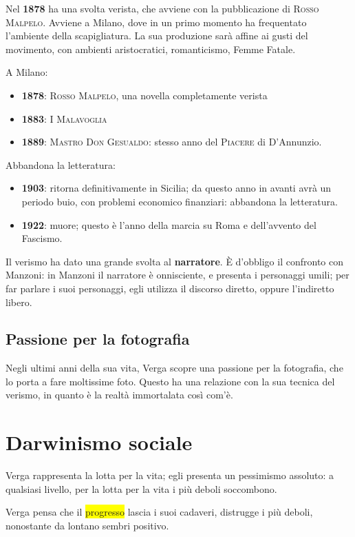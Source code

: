 \documentclass{book}
\newcommand{\pagine}[1]{\colorbox{yellow}{#1}}
\newcounter{mar}
\begin{document}
Nel \textbf{1878} ha una svolta verista, che avviene con la
pubblicazione di \textsc{Rosso Malpelo}. Avviene a Milano, dove in un
primo momento ha frequentato l'ambiente della scapigliatura. La sua
produzione sarà affine ai gusti del movimento, con ambienti
aristocratici, romanticismo, Femme Fatale.

A Milano: 
\begin{itemize}
\item \textbf{1878}: \textsc{Rosso Malpelo}, una novella
completamente verista
\item \textbf{1883}: \textsc{I Malavoglia}
\item \textbf{1889}: \textsc{Mastro Don Gesualdo}: stesso anno del \textsc{Piacere} di D'Annunzio.
\end{itemize}

Abbandona la letteratura: 
\begin{itemize}
\item \textbf{1903}: ritorna definitivamente in
Sicilia; da questo anno in avanti avrà un periodo buio, con problemi
economico finanziari: abbandona la letteratura. 
\item \textbf{1922}: muore; questo è l'anno della marcia su Roma e dell'avvento del Fascismo.
\end{itemize}

Il verismo ha dato una grande svolta al \textbf{narratore}. È d'obbligo
il confronto con Manzoni: in Manzoni il narratore è onnisciente, e
presenta i personaggi umili; per far parlare i suoi personaggi, egli
utilizza il discorso diretto, oppure l'indiretto libero.

\subsection{Passione per la fotografia}

Negli ultimi anni della sua vita, Verga scopre una passione per la
fotografia, che lo porta a fare moltissime foto. Questo ha una relazione
con la sua tecnica del verismo, in quanto è la realtà immortalata così
com'è.

\section{Darwinismo sociale}

Verga rappresenta la lotta per la vita; egli presenta un pessimismo
assoluto: a qualsiasi livello, per la lotta per la vita i più deboli
soccombono.

Verga pensa che il \pagine{progresso} lascia i suoi cadaveri, distrugge
i più deboli, nonostante da lontano sembri positivo.
\end{document}
